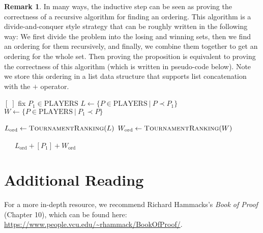 \documentclass{article}
\theoremstyle{plain}
\theoremstyle{definition}
\newtheorem{remark}{Remark}
\begin{document}
\begin{remark}
    In many ways, the inductive step can be seen as proving the correctness of a recursive algorithm for finding an ordering. This algorithm is a divide-and-conquer style strategy that can be roughly written in the following way: We first divide the problem into the losing and winning sets, then we find an ordering for them recursively, and finally, we combine them together to get an ordering for the whole set. Then proving the proposition is equivalent to proving the correctness of this algorithm (which is written in pseudo-code below). Note we store this ordering in a list data structure that supports list concatenation with the \(+\) operator.
    \begin{center}
    \begin{minipage}{.5\linewidth}
    \begin{algorithmic}[1]
                \Return \([\;]\)
            \Else
                \State fix \(P_1 \in \text{PLAYERS}\)
                \State \(L \leftarrow \{P \in \text{PLAYERS}\ |\ P \prec P_1\}\)
                \State \(W \leftarrow \{P \in \text{PLAYERS}\ |\ P_1 \prec P\}\)

                \State \(L_{\text{ord}} \leftarrow \textsc{TournamentRanking}(L)\)
                \State \(W_{\text{ord}} \leftarrow \textsc{TournamentRanking}(W)\)

                \ \ \ \Return \(L_{\text{ord}} + [P_1] + W_{\text{ord}}\)
            \EndIf 
        \EndProcedure
    \end{algorithmic}
    \end{minipage}
    \end{center}
\end{remark}

\section{Additional Reading}

For a more in-depth resource, we recommend Richard Hammacks's \emph{Book of Proof} (Chapter 10), which can be found here: \url{https://www.people.vcu.edu/~rhammack/BookOfProof/}.
\end{document}
